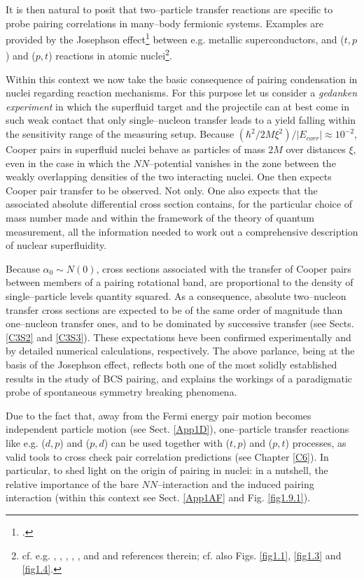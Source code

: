 It is then natural to posit that two--particle transfer reactions are specific to probe pairing correlations in many--body fermionic systems. Examples are provided by the Josephson effect\footnote{\cite{Josephson:62}.} between e.g. metallic superconductors, and ($t,p$) and ($p,t$) reactions in atomic nuclei\footnote{cf. e.g. \cite{Yoshida:62}, \cite{Broglia:73}, \cite{Bayman:71}, \cite{Glendenning:65}, \cite{Bohr:64}, \cite{Hansen:12} and \cite{Potel:13} and references therein; cf. also Figs. \ref{fig1.1}, \ref{fig1.3} and \ref{fig1.4}.}.

Within this context we now take the basic consequence of pairing condensation in nuclei regarding reaction mechanisms. For this purpose let us consider a \textit{gedanken experiment} in which the superfluid target and the projectile can at best come in such weak contact that only  single--nucleon transfer leads to a yield falling within the sensitivity range of the measuring setup. Because $\left(\hbar^2/2M\xi^2\right)/|E_{corr}|\approx10^{-2}$, Cooper pairs in superfluid nuclei behave as particles of mass $2M$
 over distances $\xi$, even in the case in which the $NN$--potential vanishes in the zone between the weakly overlapping densities of the two interacting nuclei. One then expects Cooper pair transfer to be observed. Not only. One also expects that the associated absolute differential cross section contains, for the particular choice of mass number made and within the framework of the theory of quantum measurement, all the information needed to work out a comprehensive description of nuclear superfluidity.
 
 Because $\alpha_0\sim N(0)$, cross sections associated with the transfer of Cooper pairs between members of a pairing rotational band, are proportional to the density of single--particle levels quantity squared. As a consequence, absolute two--nucleon transfer cross sections are expected to be of the same order of magnitude than one--nucleon transfer ones, and to be dominated by successive transfer (see Sects. \ref{C3S2} and \ref{C3S3}). These expectations heve been confirmed experimentally and by detailed numerical calculations, respectively.
 The above parlance, being at the basis of the Josephson effect, reflects both one of the most solidly established results in the study of BCS pairing, and explains the workings of a paradigmatic probe of spontaneous symmetry breaking phenomena.
 
 
 
Due to the fact that, away from the Fermi energy pair  motion becomes independent particle motion (see Sect. \ref{App1D}), one--particle transfer reactions like e.g. ($d,p$) and ($p,d$) can be used together with ($t,p$) and ($p,t$) processes, as  valid tools to cross check pair correlation predictions (see Chapter \ref{C6}). In particular, to shed light on the origin of pairing in nuclei: in a nutshell, the relative importance of the bare $NN$--interaction and the induced pairing interaction (within this context see Sect. \ref{App1AF} and Fig. \ref{fig1.9.1}).

